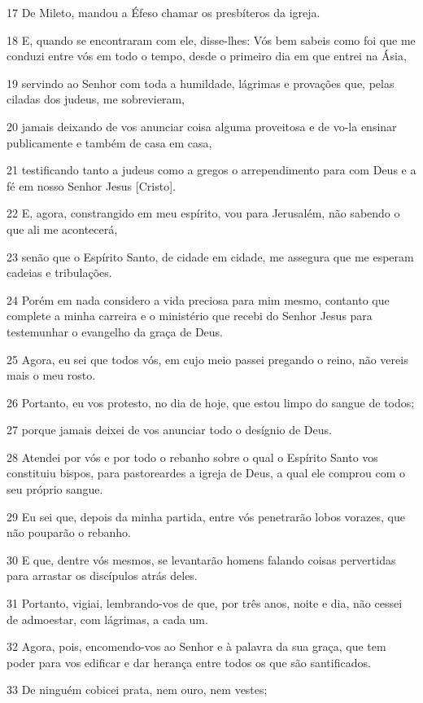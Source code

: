 \par 17 De Mileto, mandou a Éfeso chamar os presbíteros da igreja.
\par 18 E, quando se encontraram com ele, disse-lhes: Vós bem sabeis como foi que me conduzi entre vós em todo o tempo, desde o primeiro dia em que entrei na Ásia,
\par 19 servindo ao Senhor com toda a humildade, lágrimas e provações que, pelas ciladas dos judeus, me sobrevieram,
\par 20 jamais deixando de vos anunciar coisa alguma proveitosa e de vo-la ensinar publicamente e também de casa em casa,
\par 21 testificando tanto a judeus como a gregos o arrependimento para com Deus e a fé em nosso Senhor Jesus [Cristo].
\par 22 E, agora, constrangido em meu espírito, vou para Jerusalém, não sabendo o que ali me acontecerá,
\par 23 senão que o Espírito Santo, de cidade em cidade, me assegura que me esperam cadeias e tribulações.
\par 24 Porém em nada considero a vida preciosa para mim mesmo, contanto que complete a minha carreira e o ministério que recebi do Senhor Jesus para testemunhar o evangelho da graça de Deus.
\par 25 Agora, eu sei que todos vós, em cujo meio passei pregando o reino, não vereis mais o meu rosto.
\par 26 Portanto, eu vos protesto, no dia de hoje, que estou limpo do sangue de todos;
\par 27 porque jamais deixei de vos anunciar todo o desígnio de Deus.
\par 28 Atendei por vós e por todo o rebanho sobre o qual o Espírito Santo vos constituiu bispos, para pastoreardes a igreja de Deus, a qual ele comprou com o seu próprio sangue.
\par 29 Eu sei que, depois da minha partida, entre vós penetrarão lobos vorazes, que não pouparão o rebanho.
\par 30 E que, dentre vós mesmos, se levantarão homens falando coisas pervertidas para arrastar os discípulos atrás deles.
\par 31 Portanto, vigiai, lembrando-vos de que, por três anos, noite e dia, não cessei de admoestar, com lágrimas, a cada um.
\par 32 Agora, pois, encomendo-vos ao Senhor e à palavra da sua graça, que tem poder para vos edificar e dar herança entre todos os que são santificados.
\par 33 De ninguém cobicei prata, nem ouro, nem vestes;
